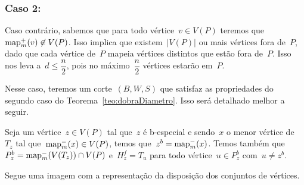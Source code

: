 	\bigskip
	\bigskip

		\subsubsection*{Caso 2:}
			Caso contrário, sabemos que para todo vértice~${v\in V(P)}$
			teremos que~${\mathrm{map}_m^+(v)\not\in V(P)}$.
			Isso implica que existem~$|V(P)|$ ou mais vértices fora de~$P$,
			dado que cada vértice de~$P$ mapeia vértices distintos que estão
			fora de~$P$.
			Isso nos leva a~$d\le\dfrac{n}{2}$, pois no 
			máximo~$\dfrac{n}{2}$ vértices estarão em~$P$.

			Nesse caso, teremos um corte~$(B,W,S)$ que satisfaz as
			propriedades do segundo caso do Teorema~\ref{teo:dobraDiametro}.
			Isso será detalhado melhor a seguir.

			\bigskip
			

			Seja um vértice~${z\in V(P)}$ tal que~$z$ é b-especial e
			sendo~$x$ o menor vértice de~$T_z$ tal 
			que~${\mathrm{map}^-_m(x)\in V(P)}$, temos 
			que~${z^b = \mathrm{map}^-_m(x)}$.
			Temos também
			que~${P_z^b = \mathrm{map}^-_m(V(T_z))\cap V(P)}$
			e~${H_z^f =T_u}$ para todo 
			vértice~${u\in P_z^b}$ com~${u\ne z^b}$.

			Segue uma imagem com a representação da disposição dos 
			conjuntos de vértices.


